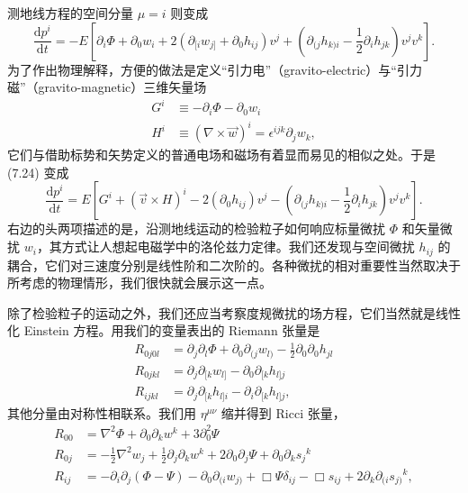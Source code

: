 测地线方程的空间分量 $\mu = i$ 则变成
\begin{equation*}
\frac{\mathrm{d}p^{i}}{\mathrm{d}t} = -E\left[\partial_{i}\Phi + \partial_{0}w_{i} + 2(\partial_{[i}w_{j]} + \partial_{0}h_{ij})v^{j} + \left(\partial_{(j}h_{k)i} - \frac{1}{2}\partial_{i}h_{jk}\right)v^{j}v^{k}\right].
\tag{7.24}
\end{equation*}
为了作出物理解释，方便的做法是定义“引力电”（gravito-electric）与“引力磁”（gravito-magnetic）三维矢量场
\begin{align*}
G^{i} &\equiv -\partial_{i}\Phi - \partial_{0}w_{i} \\
H^{i} &\equiv (\nabla \times \vec{w})^{i} = \epsilon^{ijk}\partial_{j}w_{k},
\tag{7.25}
\end{align*}
它们与借助标势和矢势定义的普通电场和磁场有着显而易见的相似之处。于是 (7.24) 变成
\begin{equation*}
\frac{\mathrm{d}p^{i}}{\mathrm{d}t} = E\left[G^{i} + (\vec{v} \times H)^{i} - 2(\partial_{0}h_{ij})v^{j} - \left(\partial_{(j}h_{k)i} - \frac{1}{2}\partial_{i}h_{jk}\right)v^{j}v^{k}\right].
\tag{7.26}
\end{equation*}
右边的头两项描述的是，沿测地线运动的检验粒子如何响应标量微扰 $\Phi$ 和矢量微扰 $w_{i}$，其方式让人想起电磁学中的洛伦兹力定律。我们还发现与空间微扰 $h_{ij}$ 的耦合，它们对三速度分别是线性阶和二次阶的。各种微扰的相对重要性当然取决于所考虑的物理情形，我们很快就会展示这一点。

除了检验粒子的运动之外，我们还应当考察度规微扰的场方程，它们当然就是线性化 Einstein 方程。用我们的变量表出的 Riemann 张量是
\begin{align*}
R_{0j0l} &= \partial_{j}\partial_{l}\Phi + \partial_{0}\partial_{(j}w_{l)} - \frac{1}{2}\partial_{0}\partial_{0}h_{jl} \\
R_{0jkl} &= \partial_{j}\partial_{[k}w_{l]} - \partial_{0}\partial_{[k}h_{l]j} \\
R_{ijkl} &= \partial_{j}\partial_{[k}h_{l]i} - \partial_{i}\partial_{[k}h_{l]j},
\tag{7.27}
\end{align*}
其他分量由对称性相联系。我们用 $\eta^{\mu\nu}$ 缩并得到 Ricci 张量，
\begin{align*}
R_{00} &= \nabla^{2}\Phi + \partial_{0}\partial_{k}w^{k} + 3\partial_{0}^{2}\Psi \\
R_{0j} &= -\frac{1}{2}\nabla^{2}w_{j} + \frac{1}{2}\partial_{j}\partial_{k}w^{k} + 2\partial_{0}\partial_{j}\Psi + \partial_{0}\partial_{k}s_{j}{}^{k} \\
R_{ij} &= -\partial_{i}\partial_{j}(\Phi - \Psi) - \partial_{0}\partial_{(i}w_{j)} + \Box\Psi\delta_{ij} - \Box s_{ij} + 2\partial_{k}\partial_{(i}s_{j)}{}^{k},
\tag{7.28}
\end{align*}

